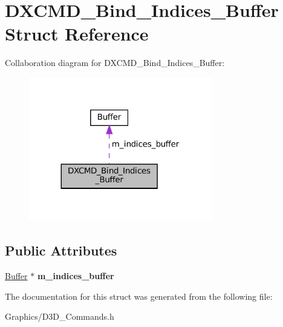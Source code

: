 \hypertarget{structDXCMD__Bind__Indices__Buffer}{}\section{D\+X\+C\+M\+D\+\_\+\+Bind\+\_\+\+Indices\+\_\+\+Buffer Struct Reference}
\label{structDXCMD__Bind__Indices__Buffer}


Collaboration diagram for D\+X\+C\+M\+D\+\_\+\+Bind\+\_\+\+Indices\+\_\+\+Buffer\+:\nopagebreak
\begin{figure}[H]
\begin{center}
\leavevmode
\includegraphics[width=227pt]{structDXCMD__Bind__Indices__Buffer__coll__graph}
\end{center}
\end{figure}
\subsection*{Public Attributes}
\begin{DoxyCompactItemize}
\item 
\mbox{\label{structDXCMD__Bind__Indices__Buffer_a6f6eedb86f45db5d40f3526641ec5746}} 
\hyperlink{classBuffer}{Buffer} $\ast$ {\bfseries m\+\_\+indices\+\_\+buffer}
\end{DoxyCompactItemize}


The documentation for this struct was generated from the following file\+:\begin{DoxyCompactItemize}
\item 
Graphics/D3\+D\+\_\+\+Commands.\+h\end{DoxyCompactItemize}
